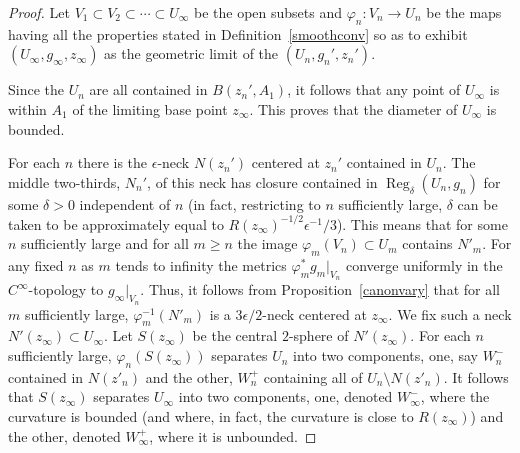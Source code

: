 \begin{proof}
\sketch
Let $V_1\subset V_2 \subset \cdots \subset U_\infty$ be the open
subsets and $\varphi_n\colon V_n\to U_n$ be the maps having all the
properties stated in Definition~\ref{smoothconv} so as to exhibit
$(U_\infty,g_\infty,z_\infty)$ as the  geometric limit of the
$(U_n,g_n',z_n')$.

Since the $U_n$ are all contained in $B(z_n',A_1)$, it follows that any point
of $U_\infty$ is within $A_1$ of the limiting base point $z_\infty$. This
proves that the diameter of $U_\infty$ is bounded.




For each $n$ there is the  $\epsilon$-neck $N(z_n')$ centered at
$z_n'$ contained in $U_n$. The middle two-thirds, $N_n'$, of this
neck has closure contained in $\operatorname{Reg}_\delta(U_n,g_n)$ for some
$\delta>0$ independent of $n$ (in fact, restricting to $n$
sufficiently large, $\delta$ can be taken to be approximately equal
to $R(z_\infty)^{-1/2}\epsilon^{-1}/3$). This means that for some
$n$ sufficiently large and for all $m\ge n$ the image
$\varphi_m(V_n)\subset U_m$ contains $N'_m$. For any fixed $n$ as
$m$ tends to infinity  the metrics $\varphi_m^*g_m|_{V_n}$ converge
uniformly in the $C^\infty$-topology to $g_\infty|_{V_n}$. Thus, it
follows from Proposition~\ref{canonvary} that for all $m$
sufficiently large, $\varphi^{-1}_m(N'_m)$ is a $3\epsilon/2$-neck
centered at $z_\infty$. We fix such a neck $N'(z_\infty)\subset
U_\infty$. Let $S(z_\infty)$ be the central $2$-sphere of
$N'(z_\infty)$. For each $n$ sufficiently large,
$\varphi_n(S(z_\infty))$ separates $U_n$ into two components, one,
say $W^-_n$ contained in $N(z'_n)$ and the other, $W^+_n$ containing
all of $U_n\setminus N(z'_n)$. It follows that $S(z_\infty)$
separates $U_\infty$ into two components, one, denoted $W^-_\infty$,
where the curvature is bounded (and where, in fact, the curvature is
close to $R(z_\infty)$) and the other, denoted $W^+_\infty$, where
it is unbounded.


\end{proof}
